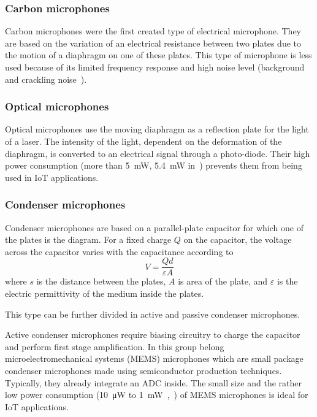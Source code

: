 \documentclass{EPL-master-thesis-covers-EN}
\begin{document}
\subsubsection*{Carbon microphones}

Carbon microphones were the first created type of electrical microphone. They are based on the variation of an electrical resistance between two plates due to the motion of a diaphragm on one of these plates. This type of microphone is less used because of its limited frequency response and high noise level (background and crackling noise~\cite{background.noise}).

\subsubsection*{Optical microphones}

Optical microphones use the moving diaphragm as a reflection plate for the light of a laser. The intensity of the light, dependent on the deformation of the diaphragm, is converted to an electrical signal through a photo-diode. Their high power consumption (more than \SI{5}{mW}, \SI{5.4}{mW} in~\cite{optical_microphone})  prevents them from being used in IoT applications.

\subsubsection*{Condenser microphones}

Condenser microphones are based on a parallel-plate capacitor for which one of the plates is the diagram. For a fixed charge $Q$ on the capacitor, the voltage across the capacitor varies with the capacitance according to
\[
V = \frac{Qd}{\varepsilon A}
\]
where $s$ is the distance between the plates, $A$ is area of the plate, and $\varepsilon$ is the electric permittivity of the medium inside the plates.

This type can be further divided in active and passive condenser microphones.

Active condenser microphones require biasing circuitry to charge the capacitor and perform first stage amplification. In this group belong microelectromechanical systems (MEMS) microphones which are small package condenser microphones made using semiconductor production techniques. Typically, they already integrate an ADC inside. The small size and the rather low power consumption (\SI{10}{\micro W} to  \SI{1}{mW}~\cite{ICS40720},~\cite{10.3390/mi9070323}) of MEMS microphones is ideal for IoT applications.
 
\end{document}
